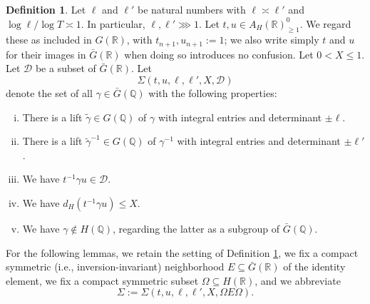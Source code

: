 \documentclass[reqno]{amsart}
\theoremstyle{plain} \newtheorem{theorem} {Theorem}
\theoremstyle{definition} \newtheorem{definition} [theorem] {Definition}
\theoremstyle{itplain} %
\numberwithin{equation}{section}
\numberwithin{theorem}{section}
\renewcommand{\geq}{\geqslant}
\renewcommand{\leq}{\leqslant}
\begin{document}
\begin{definition}\label{defn:standard2:let-ell-ell}
Let $\ell$ and $\ell '$ be natural numbers with $\ell \asymp \ell '$ and $\log \ell / \log T \asymp 1$.  In particular, $\ell, \ell ' \ggg 1$.  Let $t, u \in A_H(\mathbb{R})^0_{\geq 1}$.  We regard these as included in $G(\mathbb{R})$, with $t_{n+1}, u_{n+1} := 1$; we also write simply $t$ and $u$ for their images in $\bar{G}(\mathbb{R})$ when doing so introduces no confusion.  Let $0 < X \leq 1$.  Let $\mathcal{D}$ be a subset of $\bar{G}(\mathbb{R})$.  Let
\begin{equation*}
  \Sigma(t, u, \ell, \ell', X, \mathcal{D})
\end{equation*}
denote the set of all $\gamma \in \bar{G}(\mathbb{Q})$ with the following properties:
\begin{enumerate}[(i)]
\item \label{itm:scratch-research:Sigma-count-1}
  There is a lift $\tilde{\gamma} \in G(\mathbb{Q})$ of $\gamma$ with integral entries and determinant $\pm \ell$.
\item \label{itm:scratch-research:Sigma-count-2}
  There is a lift $\tilde{\gamma}^{-1} \in G(\mathbb{Q})$ of $\gamma^{-1}$ with integral entries and determinant $\pm \ell '$.
\item \label{itm:scratch-research:Sigma-count-3} We have $t^{-1} \gamma u \in \mathcal{D}$.
\item \label{itm:scratch-research:Sigma-count-4}  We have $d_H(t^{-1} \gamma u) \leq X$.
\item \label{itm:scratch-research:Sigma-count-5} We have $\gamma \notin H(\mathbb{Q})$,  regarding the latter as a subgroup of $\bar{G}(\mathbb{Q})$.
\end{enumerate}
\end{definition}

For the following lemmas, we retain the setting of Definition \ref{defn:standard2:let-ell-ell}, we fix a compact symmetric (i.e., inversion-invariant) neighborhood $E \subseteq \bar{G}(\mathbb{R})$ of the identity element, we fix a compact symmetric subset $\Omega \subseteq H(\mathbb{R})$, and we abbreviate
\begin{equation*}
  \Sigma := \Sigma(t,u,\ell, \ell', X, \Omega E \Omega).
\end{equation*}
\end{document}
